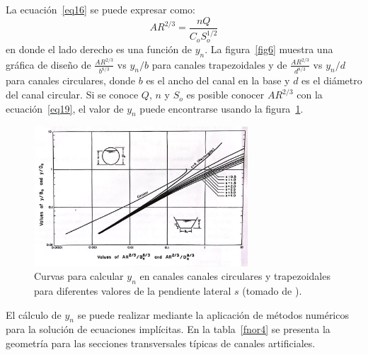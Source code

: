 \documentclass[11pt, oneside]{article}
\begin{document}
La ecuaci\'on~\ref{eq16} se puede expresar como:
\begin{equation}
A R^{2/3} = \frac{nQ}{C_o S_o^{1/2}}
\label{eq19}
\end{equation}
en donde el lado derecho es una funci\'on de $y_n$. La figura~\ref{fig6} muestra una gráfica de diseño de $\frac{A R^{2/3}}{b^{8/3}}$ vs $y_n / b$ para canales trapezoidales y de $\frac{A R^{2/3}}{d^{8/3}}$ vs $y_n / d$ para canales circulares, donde $b$ es el ancho del canal en la base y $d$ es el diámetro del canal circular. Si se conoce $Q$, $n$ y $S_o$ es posible conocer $A R^{2/3}$ con la ecuaci\'on~\ref{eq19}, el valor de $y_n$ puede encontrarse usando la figura~\ref{fig7}. 

\begin{figure}[h]
\centering
\includegraphics[width=8cm]{fig45.jpeg}
\caption{Curvas para calcular $y_n$ en canales canales circulares y trapezoidales para diferentes valores de la pendiente lateral $s$ (tomado de \cite{VChow}).}
\label{fig7}
\end{figure}

El c\'alculo de $y_n$ se puede realizar mediante la aplicaci\'on de m\'etodos num\'ericos para la soluci\'on de ecuaciones implícitas. En la tabla~\ref{fnor4} se presenta la geometr\'ia para las secciones transversales t\'ipicas de canales artificiales.
\end{document}
